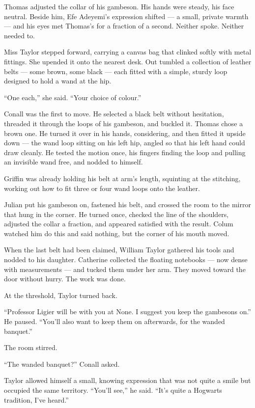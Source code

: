 Thomas adjusted the collar of his gambeson. His hands were steady, his face neutral. Beside him, Efe Adeyemi's expression shifted --- a small, private warmth --- and his eyes met Thomas's for a fraction of a second. Neither spoke. Neither needed to.
 
Miss Taylor stepped forward, carrying a canvas bag that clinked softly with metal fittings. She upended it onto the nearest desk. Out tumbled a collection of leather belts --- some brown, some black --- each fitted with a simple, sturdy loop designed to hold a wand at the hip.
 
\enquote{One each,} she said. \enquote{Your choice of colour.}
 
Conall was the first to move. He selected a black belt without hesitation, threaded it through the loops of his gambeson, and buckled it. Thomas chose a brown one. He turned it over in his hands, considering, and then fitted it upside down --- the wand loop sitting on his left hip, angled so that his left hand could draw cleanly. He tested the motion once, his fingers finding the loop and pulling an invisible wand free, and nodded to himself.
 
Griffin was already holding his belt at arm's length, squinting at the stitching, working out how to fit three or four wand loops onto the leather.
 
Julian put his gambeson on, fastened his belt, and crossed the room to the mirror that hung in the corner. He turned once, checked the line of the shoulders, adjusted the collar a fraction, and appeared satisfied with the result. Colum watched him do this and said nothing, but the corner of his mouth moved.
 
When the last belt had been claimed, William Taylor gathered his tools and nodded to his daughter. Catherine collected the floating notebooks --- now dense with measurements --- and tucked them under her arm. They moved toward the door without hurry. The work was done.
 
At the threshold, Taylor turned back.
 
\enquote{Professor Ligier will be with you at None. I suggest you keep the gambesons on.} He paused. \enquote{You'll also want to keep them on afterwards, for the wanded banquet.}
 
The room stirred.
 
\enquote{The wanded banquet?} Conall asked.
 
Taylor allowed himself a small, knowing expression that was not quite a smile but occupied the same territory. \enquote{You'll see,} he said. \enquote{It's quite a Hogwarts tradition, I've heard.}
 
